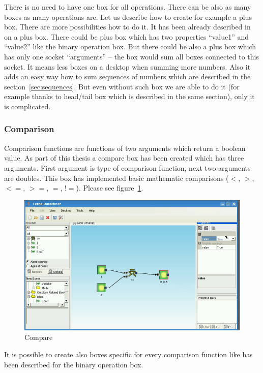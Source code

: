 \documentclass[a4paper,12pt]{book}
\begin{document}
There is no need to have one box for all operations. There can be also as many boxes as many operations are. Let us describe how to create for example a plus box. There are more possibilities how to do it. It has been already described in~\cite{znalosti2006} on a plus box. There could be plus box which has two properties ``value1'' and ``value2'' like the binary operation box. But there could be also a plus box which has only one socket ``arguments'' -- the box would sum all boxes connected to this socket. It means less boxes on a desktop when summing more numbers. Also it adds an easy way how to sum sequences of numbers which are described in the section~\ref{sec:sequences}. But even without such box we are able to do it (for example thanks to head/tail box which is described in the same section), only it is complicated.    

\subsubsection{Comparison}
Comparison functions are functions of two arguments which return a boolean value. As part of this thesis a compare box has been created which has three arguments. First argument is type of comparison function, next two arguments are doubles. This box has implemented basic mathematic comparisons ($<$, $>$, $<=$, $>=$, $=$, $!=$). Please see figure~\ref{fig:boxCompare}.
\begin{figure}
	\includegraphics[width=1\textwidth]{compare2.png}
	\caption{Compare}
	\label{fig:boxCompare}
\end{figure}

It is possible to create also boxes specific for every comparison function like has been described for the binary operation box.
\end{document}
